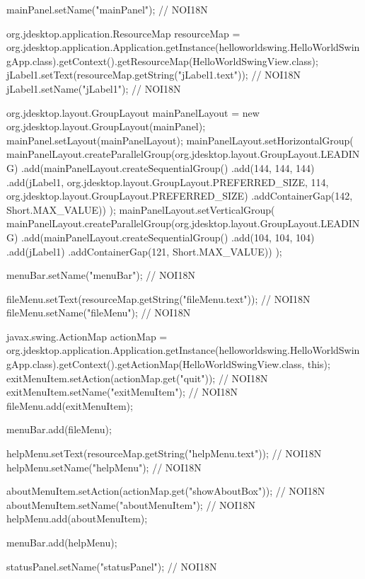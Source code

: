 {{        mainPanel.setName("mainPanel"); // NOI18N

        org.jdesktop.application.ResourceMap resourceMap = org.jdesktop.application.Application.getInstance(helloworldswing.HelloWorldSwingApp.class).getContext().getResourceMap(HelloWorldSwingView.class);
        jLabel1.setText(resourceMap.getString("jLabel1.text")); // NOI18N
        jLabel1.setName("jLabel1"); // NOI18N

        org.jdesktop.layout.GroupLayout mainPanelLayout = new org.jdesktop.layout.GroupLayout(mainPanel);
        mainPanel.setLayout(mainPanelLayout);
        mainPanelLayout.setHorizontalGroup(
            mainPanelLayout.createParallelGroup(org.jdesktop.layout.GroupLayout.LEADING)
            .add(mainPanelLayout.createSequentialGroup()
                .add(144, 144, 144)
                .add(jLabel1, org.jdesktop.layout.GroupLayout.PREFERRED_SIZE, 114, org.jdesktop.layout.GroupLayout.PREFERRED_SIZE)
                .addContainerGap(142, Short.MAX_VALUE))
        );
        mainPanelLayout.setVerticalGroup(
            mainPanelLayout.createParallelGroup(org.jdesktop.layout.GroupLayout.LEADING)
            .add(mainPanelLayout.createSequentialGroup()
                .add(104, 104, 104)
                .add(jLabel1)
                .addContainerGap(121, Short.MAX_VALUE))
        );

        menuBar.setName("menuBar"); // NOI18N

        fileMenu.setText(resourceMap.getString("fileMenu.text")); // NOI18N
        fileMenu.setName("fileMenu"); // NOI18N

        javax.swing.ActionMap actionMap = org.jdesktop.application.Application.getInstance(helloworldswing.HelloWorldSwingApp.class).getContext().getActionMap(HelloWorldSwingView.class, this);
        exitMenuItem.setAction(actionMap.get("quit")); // NOI18N
        exitMenuItem.setName("exitMenuItem"); // NOI18N
        fileMenu.add(exitMenuItem);

        menuBar.add(fileMenu);

        helpMenu.setText(resourceMap.getString("helpMenu.text")); // NOI18N
        helpMenu.setName("helpMenu"); // NOI18N

        aboutMenuItem.setAction(actionMap.get("showAboutBox")); // NOI18N
        aboutMenuItem.setName("aboutMenuItem"); // NOI18N
        helpMenu.add(aboutMenuItem);

        menuBar.add(helpMenu);

        statusPanel.setName("statusPanel"); // NOI18N

}}

